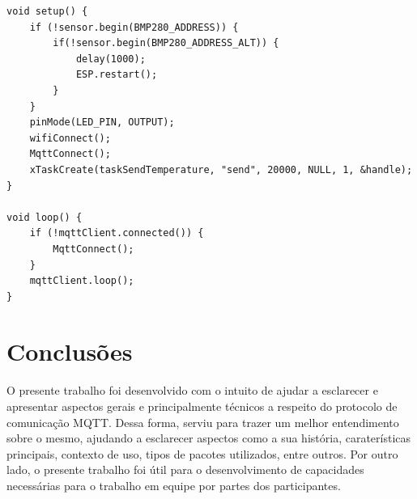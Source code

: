 \documentclass[12pt, a4paper]{article}
\begin{document}
\begin{lstlisting}
void setup() {
    if (!sensor.begin(BMP280_ADDRESS)) {
        if(!sensor.begin(BMP280_ADDRESS_ALT)) {
            delay(1000);
            ESP.restart();
        }
    }
    pinMode(LED_PIN, OUTPUT);
    wifiConnect();
    MqttConnect();
    xTaskCreate(taskSendTemperature, "send", 20000, NULL, 1, &handle);
}

void loop() {
    if (!mqttClient.connected()) {
        MqttConnect();
    }
    mqttClient.loop();
}
\end{lstlisting}


\cleardoublepage

\section{Conclusões}

O presente trabalho foi desenvolvido com o intuito de ajudar a esclarecer e apresentar aspectos gerais e principalmente técnicos a respeito do protocolo de comunicação MQTT. Dessa forma, serviu para trazer um melhor entendimento sobre o mesmo, ajudando a esclarecer aspectos como a sua história, caraterísticas principais, contexto de uso, tipos de pacotes utilizados, entre outros. Por outro lado, o presente trabalho foi útil para o desenvolvimento de capacidades necessárias para o trabalho em equipe por partes dos participantes.

\cleardoublepage


\end{document}
